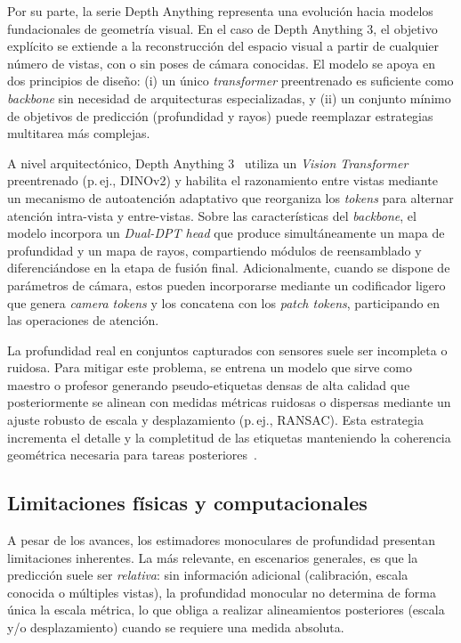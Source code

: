     Por su parte, la serie Depth Anything representa una evolución hacia modelos fundacionales de geometría visual. En el caso de 
    Depth Anything 3, el objetivo explícito se extiende a la reconstrucción del espacio visual a partir de cualquier número de vistas, 
    con o sin poses de cámara conocidas. El modelo se apoya en dos principios de diseño: (i) un único \textit{transformer} preentrenado es 
    suficiente como \textit{backbone} sin necesidad de arquitecturas especializadas, y (ii) un conjunto mínimo de objetivos de predicción 
    (profundidad y rayos) puede reemplazar estrategias multitarea más complejas.

    A nivel arquitectónico, Depth Anything 3~\cite{overview-da} utiliza un \textit{Vision Transformer} preentrenado (p.\,ej., DINOv2) y habilita el 
    razonamiento entre vistas mediante un mecanismo de autoatención adaptativo que reorganiza los \textit{tokens} para alternar atención 
    intra-vista y entre-vistas. Sobre las características del \textit{backbone}, el modelo incorpora un \textit{Dual-DPT head} que produce 
    simultáneamente un mapa de profundidad y un mapa de rayos, compartiendo módulos de reensamblado y diferenciándose en la etapa de fusión 
    final. Adicionalmente, cuando se dispone de parámetros de cámara, estos pueden incorporarse mediante un codificador ligero que genera 
    \textit{camera tokens} y los concatena con los \textit{patch tokens}, participando en las operaciones de atención.

    La profundidad real en conjuntos capturados con sensores suele ser incompleta o ruidosa. Para mitigar este problema, se entrena un 
    modelo que sirve como maestro o profesor generando pseudo-etiquetas densas de alta calidad que posteriormente 
    se alinean con medidas métricas ruidosas o dispersas mediante un ajuste robusto de escala y desplazamiento (p.\,ej., RANSAC). 
    Esta estrategia incrementa el detalle y la completitud de las etiquetas manteniendo la coherencia geométrica necesaria para tareas 
    posteriores~\cite{overview-da}.

    \subsection{Limitaciones físicas y computacionales}
    A pesar de los avances, los estimadores monoculares de profundidad presentan limitaciones inherentes. La más relevante, en escenarios 
    generales, es que la predicción suele ser \textit{relativa}: sin información adicional (calibración, escala conocida o múltiples vistas), 
    la profundidad monocular no determina de forma única la escala métrica, lo que obliga a realizar alineamientos posteriores 
    (escala y/o desplazamiento) cuando se requiere una medida absoluta.


